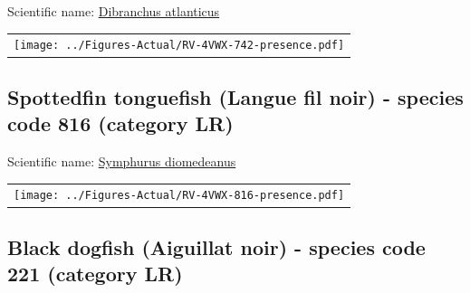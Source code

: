 \documentclass[12pt]{article}\usepackage[]{graphicx}\usepackage[]{color}
\begin{document}
  


Scientific name: \href{http://www.marinespecies.org/aphia.php?p=taxdetails\&id=126558}{Dibranchus atlanticus} \newline
\begin{minipage}{1.0\textwidth}
 \begin{tabular}{c}
\texttt{[image: ../Figures-Actual/RV-4VWX-742-presence.pdf]} \\ 
\end{tabular} 
\end{minipage}
\clearpage

\renewcommand\thefigure{\thesubsection\Alph{figure}}

\setcounter{figure}{0}

\hypertarget{sec:816}{%
\subsection{Spottedfin tonguefish (Langue fil noir) - species code 816 (category LR)}\label{sec:816}}

  


Scientific name: \href{http://www.marinespecies.org/aphia.php?p=taxdetails\&id=159358}{Symphurus diomedeanus} \newline
\begin{minipage}{1.0\textwidth}
 \begin{tabular}{c}
\texttt{[image: ../Figures-Actual/RV-4VWX-816-presence.pdf]} \\ 
\end{tabular} 
\end{minipage}
\clearpage

\renewcommand\thefigure{\thesubsection\Alph{figure}}

\setcounter{figure}{0}

\hypertarget{sec:221}{%
\subsection{Black dogfish (Aiguillat noir) - species code 221 (category LR)}\label{sec:221}}
\end{document}
